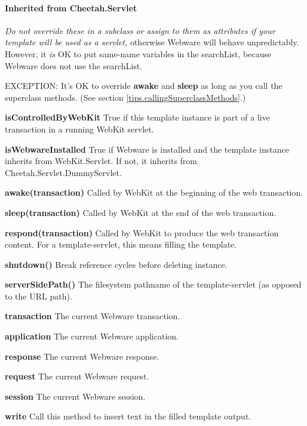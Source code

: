 \paragraph*{Inherited from Cheetah.Servlet}

{\em Do not override these in a subclass or assign to them as attributes
if your template will be used as a servlet,} otherwise Webware will behave
unpredictably.  However, it {\em is} OK to put same-name variables in the
searchList, because Webware does not use the searchList.

EXCEPTION: It's OK to override {\bf awake} and {\bf sleep} as long as you
call the superclass methods.  (See section
\ref{tips.callingSuperclassMethods}.)

\begin{description}
\item{{\bf * isControlledByWebKit}}  True if this template instance is
    part of a live transaction in a running WebKit servlet.
\item{{\bf * isWebwareInstalled}}  True if Webware is installed and the
    template instance inherits from WebKit.Servlet.  If not, it inherits
    from Cheetah.Servlet.DummyServlet.
\item{{\bf * awake(transaction)}}  Called by WebKit at the beginning of
    the web transaction.
\item{{\bf * sleep(transaction)}}  Called by WebKit at the end of the
    web transaction.
\item{{\bf * respond(transaction)}}  Called by WebKit to produce the 
    web transaction content.  For a template-servlet, this means
    filling the template.
\item{{\bf shutdown()}}  Break reference cycles before deleting instance.
\item{{\bf * serverSidePath()}}  The filesystem pathname of the 
    template-servlet (as opposed to the URL path).
\item{{\bf transaction}}  The current Webware transaction.
\item{{\bf application}}  The current Webware application.
\item{{\bf response}}  The current Webware response.
\item{{\bf request}}  The current Webware request.
\item{{\bf session}}  The current Webware session.
\item{{\bf write}}  Call this method to insert text in the filled template
    output.
\end{description}

